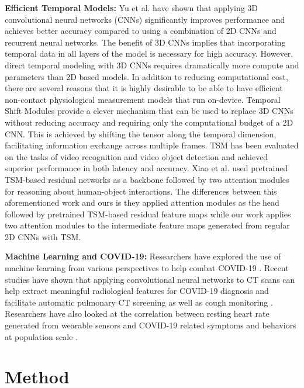 \documentclass{article}
\begin{document}
\textbf{Efficient Temporal Models:}
Yu et al. \citep{yu2019remote} have shown that applying 3D convolutional neural networks (CNNs) significantly improves performance and achieves better accuracy compared to using a combination of 2D CNNs and recurrent neural networks. The benefit of 3D CNNs implies that incorporating temporal data in all layers of the model is necessary for high accuracy. However, direct temporal modeling with 3D CNNs requires dramatically more compute and parameters than 2D based models. In addition to reducing computational cost, there are several reasons that it is highly desirable to be able to have efficient non-contact physiological measurement models that run on-device. Temporal Shift Modules \citep{lin2019tsm} provide a clever mechanism that can be used to replace 3D CNNs without reducing accuracy and requiring only the computational budget of a 2D CNN. This is achieved by shifting the tensor along the temporal dimension, facilitating information exchange across multiple frames. TSM has been evaluated on the tasks of video recognition and video object detection and achieved superior performance in both latency and accuracy. Xiao et al. \citep{xiao2019reasoning} used pretrained TSM-based residual networks as a backbone followed by two attention modules for reasoning about human-object interactions. The differences between this aforementioned work and ours is they applied attention modules as the head followed by pretrained TSM-based residual feature maps while our work applies two attention modules to the intermediate feature maps generated from regular 2D CNNs with TSM. 


\textbf{Machine Learning and COVID-19:}
Researchers have explored the use of machine learning from various perspectives to help combat COVID-19 \citep{latif2020leveraging}. Recent studies have shown that applying convolutional neural networks to CT scans can help extract meaningful radiological features for COVID-19 diagnosis and facilitate automatic pulmonary CT screening as well as cough monitoring \citep{wang2020deep, butt2020deep,al2020flusense, imran2020ai4covid}. Researchers have also looked at the correlation between resting heart rate generated from wearable sensors and COVID-19 related symptoms and behaviors at population scale \citep{khan2020coronavirus}. 



\section{Method}
\end{document}
